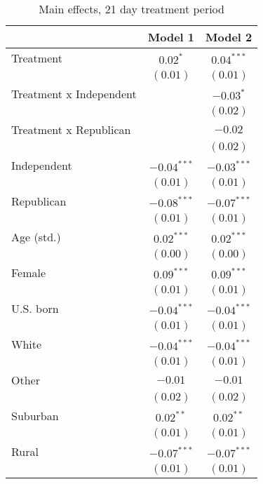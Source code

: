 
\begin{table}
\caption{Main effects, 21 day treatment period}
\begin{center}
\begin{tabular}{l c c}
\toprule
 & Model 1 & Model 2 \\
\midrule
Treatment               & $0.02^{*}$    & $0.04^{***}$  \\
                        & $(0.01)$      & $(0.01)$      \\
Treatment x Independent &               & $-0.03^{*}$   \\
                        &               & $(0.02)$      \\
Treatment x Republican  &               & $-0.02$       \\
                        &               & $(0.02)$      \\
Independent             & $-0.04^{***}$ & $-0.03^{***}$ \\
                        & $(0.01)$      & $(0.01)$      \\
Republican              & $-0.08^{***}$ & $-0.07^{***}$ \\
                        & $(0.01)$      & $(0.01)$      \\
Age (std.)              & $0.02^{***}$  & $0.02^{***}$  \\
                        & $(0.00)$      & $(0.00)$      \\
Female                  & $0.09^{***}$  & $0.09^{***}$  \\
                        & $(0.01)$      & $(0.01)$      \\
U.S. born               & $-0.04^{***}$ & $-0.04^{***}$ \\
                        & $(0.01)$      & $(0.01)$      \\
White                   & $-0.04^{***}$ & $-0.04^{***}$ \\
                        & $(0.01)$      & $(0.01)$      \\
Other                   & $-0.01$       & $-0.01$       \\
                        & $(0.02)$      & $(0.02)$      \\
Suburban                & $0.02^{**}$   & $0.02^{**}$   \\
                        & $(0.01)$      & $(0.01)$      \\
Rural                   & $-0.07^{***}$ & $-0.07^{***}$ \\
                        & $(0.01)$      & $(0.01)$      \\

\end{tabular}
\end{center}
\end{table}
